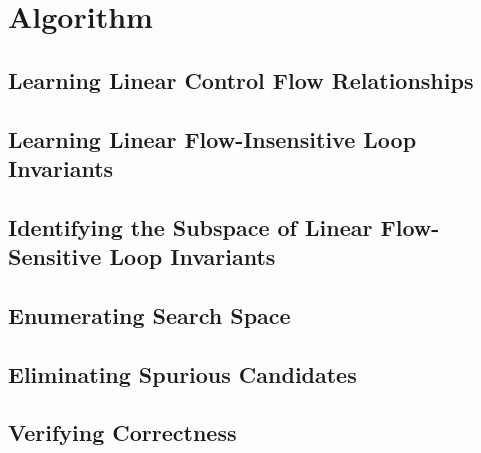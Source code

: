 \section{Algorithm}

\subsection{Learning Linear Control Flow Relationships}


\subsection{Learning Linear Flow-Insensitive Loop Invariants}


\subsection{Identifying the Subspace of Linear Flow-Sensitive Loop Invariants}


\subsection{Enumerating Search Space}


\subsection{Eliminating Spurious Candidates}


\subsection{Verifying Correctness}


